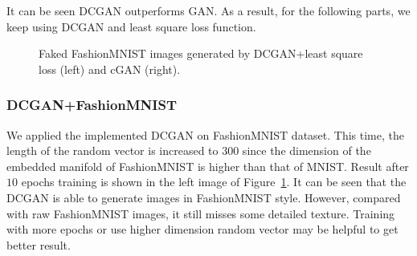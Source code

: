\documentclass[runningheads]{llncs}
\begin{document}
It can be seen DCGAN outperforms GAN. As a result, for the following parts, we keep using DCGAN and least square loss function.

\begin{figure}[ht]
	\centering
	\setlength{\fboxrule}{0.0pt}
	\caption{Faked FashionMNIST images generated by DCGAN+least square loss (left) and cGAN (right).}
	\label{fig4}
\end{figure}

\subsubsection{DCGAN+FashionMNIST} We applied the implemented DCGAN on FashionMNIST dataset. This time, the length of the random vector is increased to $300$ since the dimension of the embedded manifold of FashionMNIST is higher than that of MNIST. Result after $10$ epochs training is shown in the left image of Figure~\ref{fig4}. It can be seen that the DCGAN is able to generate images in FashionMNIST style. However, compared with raw FashionMNIST images, it still misses some detailed texture. Training with more epochs or use higher dimension random vector may be helpful to get better result.
\end{document}

